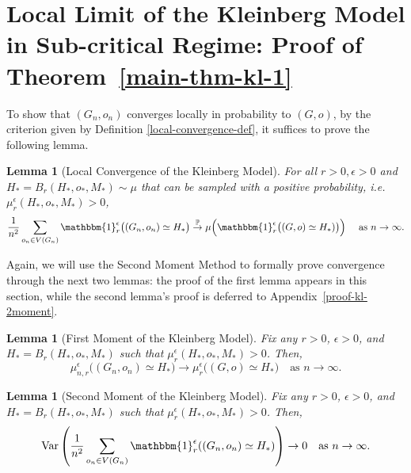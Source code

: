 \documentclass[10pt]{amsart}
\newtheorem{lemma}[theorem]{Lemma}
\begin{document}
\section{Local Limit of the Kleinberg Model in Sub-critical Regime: Proof of Theorem~\ref{main-thm-kl-1}} \label{sec:proof-main-thm-kl-1}

To show that $(G_n, o_n)$ converges locally in probability to $(G, o)$, by the criterion given by Definition \ref{local-convergence-def}, it suffices to prove the following lemma.

\begin{lemma}[Local Convergence of the Kleinberg Model] \label{main-lemma-kl-1} For all $r > 0, \epsilon > 0$ and $H_* = B_r(H_*, o_*, M_*) \sim \mu$ that can be sampled with a positive probability, i.e. $\mu_r^{\epsilon}(H_*, o_*, M_*)>0$,
\begin{equation*} 
\frac{1}{n^2}\sum_{o_n\in V(G_n)}  \mathbbm{1}_r^\epsilon\big((G_n,o_n)\simeq H_* \big)\overset{\mathbb P}{\to}\mu\Big(  \mathbbm{1}_r^\epsilon\big((G,o)\simeq H_*)\big)\Big) \quad \text{ as $n \to \infty.$}
\end{equation*}
\end{lemma}

Again, we will use the Second Moment Method to formally prove convergence through the next two lemmas: the proof of the first lemma appears in this section, while the second lemma’s proof is deferred to Appendix~\ref{proof-kl-2moment}.

\begin{lemma}[First Moment of the Kleinberg Model] \label{kl-1moment} Fix any $r > 0$, $\epsilon > 0$, and $H_* = B_r(H_*, o_*, M_*)$ such that $\mu_r^{\epsilon}(H_*, o_*, M_*)>0$. Then,
\begin{equation*} 
\mu_{n,r}^\epsilon\big((G_n, o_n) \simeq H_*\big) \to \mu_{r}^\epsilon\big((G,o) \simeq H_*\big) \quad \text{as $n \to \infty$.}
\end{equation*}
\end{lemma}

\begin{lemma}[Second Moment of the Kleinberg Model] \label{kl-2moment}Fix any $r > 0$, $\epsilon > 0$, and $H_* = B_r(H_*, o_*, M_*)$ such that $\mu_r^{\epsilon}(H_*, o_*, M_*)>0$. Then,
\begin{equation*} 
\text{Var}\left(\frac{1}{n^2}\sum_{o_n\in V(G_n)}  \mathbbm{1}_r^\epsilon((G_n,o_n)\simeq H_*) \right) \to 0 \quad \text{as $n \to \infty$.}
\end{equation*}
\end{lemma}
\end{document}
